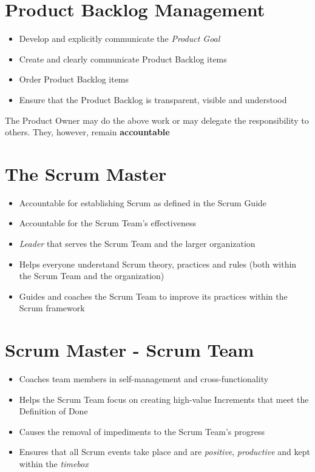 \documentclass[a4paper,11pt,twocolumn]{article}
\begin{document}
\section*{Product Backlog Management}
\begin{itemize}
	\item Develop and explicitly communicate the \textit{Product Goal}
	\item Create and clearly communicate Product Backlog items
	\item Order Product Backlog items
	\item Ensure that the Product Backlog is transparent, visible and understood
\end{itemize}

\begin{tcolorbox}[colback=black!8!white,colframe=gray!50!black,title=Note,sharp corners,fonttitle=\normalsize\bfseries,fontupper=\normalsize,left=0.7em,right=0.7em]
	The Product Owner may do the above work or may delegate the responsibility to others. They, however, remain \textbf{accountable}
\end{tcolorbox}

\section*{The Scrum Master}
\begin{itemize}
	\item Accountable for establishing Scrum as defined in the Scrum Guide
	\item Accountable for the Scrum Team's effectiveness
	\item \textit{Leader} that serves the Scrum Team and the larger organization
	\item Helps everyone understand Scrum theory, practices and rules (both within the Scrum Team and the organization)
	\item Guides and coaches the Scrum Team to improve its practices within the Scrum framework
\end{itemize}

\section*{Scrum Master - Scrum Team}
\begin{itemize}
	\item Coaches team members in self-management and cross-functionality
	\item Helps the Scrum Team focus on creating high-value Increments that meet the Definition of Done
	\item Causes the removal of impediments to the Scrum Team's progress
	\item Ensures that all Scrum events take place and are \textit{positive}, \textit{productive} and kept within the \textit{timebox}
\end{itemize}
\end{document}
